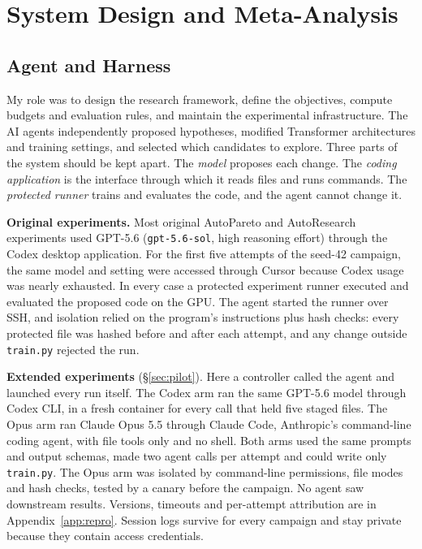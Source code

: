 \documentclass{article}
\newif\ifshowhumanmarkers \showhumanmarkersfalse
\newcommand{\humantag}[1]{{\color{humanframe}\sffamily\scriptsize\bfseries HUMAN AUTHOR MUST REWRITE/VERIFY [#1]}\ }
\newcommand{\humanauthor}[2][]{\ifshowhumanmarkers\begin{humanbox}\humantag{#1}#2\end{humanbox}\else #2\par\fi}
\begin{document}
\clearpage
\section{System Design and Meta-Analysis}\label{parttwo}

\subsection{Agent and Harness}\label{sec:agent}
\humanauthor[P2-02 r6]{My role was to design the research framework, define the objectives, compute budgets and evaluation rules, and maintain the experimental infrastructure. The AI agents independently proposed hypotheses, modified Transformer architectures and training settings, and selected which candidates to explore. Three parts of the system should be kept apart. The \emph{model} proposes each change. The \emph{coding application} is the interface through which it reads files and runs commands. The \emph{protected runner} trains and evaluates the code, and the agent cannot change it.

\textbf{Original experiments.} Most original AutoPareto and AutoResearch experiments used GPT-5.6 (\texttt{gpt-5.6-sol}, high reasoning effort) through the Codex desktop application. For the first five attempts of the seed-42 campaign, the same model and setting were accessed through Cursor because Codex usage was nearly exhausted. In every case a protected experiment runner executed and evaluated the proposed code on the GPU. The agent started the runner over SSH, and isolation relied on the program's instructions plus hash checks: every protected file was hashed before and after each attempt, and any change outside \texttt{train.py} rejected the run.

\textbf{Extended experiments} (\S\ref{sec:pilot}). Here a controller called the agent and launched every run itself. The Codex arm ran the same GPT-5.6 model through Codex CLI, in a fresh container for every call that held five staged files. The Opus arm ran Claude Opus 5.5 through Claude Code, Anthropic's command-line coding agent, with file tools only and no shell. Both arms used the same prompts and output schemas, made two agent calls per attempt and could write only \texttt{train.py}. The Opus arm was isolated by command-line permissions, file modes and hash checks, tested by a canary before the campaign. No agent saw downstream results. Versions, timeouts and per-attempt attribution are in Appendix~\ref{app:repro}. Session logs survive for every campaign and stay private because they contain access credentials.}
\end{document}
